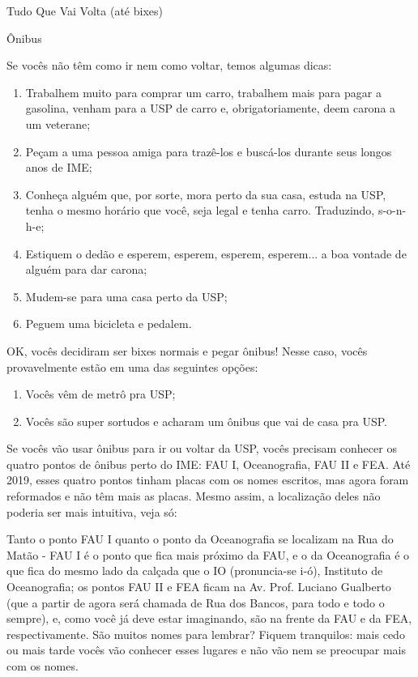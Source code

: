 \begin{secao}{Tudo Que Vai Volta (até bixes)}

\begin{subsecao}{Ônibus}

Se vocês não têm como ir nem como voltar, temos algumas dicas:

\begin{enumerate}
  \item Trabalhem muito para comprar um carro,
  trabalhem mais para pagar a gasolina,
  venham para a USP de carro e, obrigatoriamente, deem carona a um veterane;

  \item Peçam a uma pessoa amiga para trazê-los e buscá-los durante seus
  longos anos de IME;

  \item Conheça alguém que, por sorte, mora perto da sua casa, estuda na USP,
  tenha o mesmo horário que você, seja legal e tenha carro. Traduzindo, s-o-n-h-e;

  \item Estiquem o dedão e esperem, esperem, esperem, esperem... a boa vontade
  de alguém para dar carona;

  \item Mudem-se para uma casa perto da USP;

  \item Peguem uma bicicleta e pedalem.

\end{enumerate}

OK, vocês decidiram ser bixes normais e pegar ônibus! Nesse caso, vocês
provavelmente estão em uma das seguintes opções:

\begin{enumerate}
  \item Vocês vêm de metrô pra USP;
  \item Vocês são super sortudos e acharam um ônibus que vai de casa pra USP.
\end{enumerate}

Se vocês vão usar ônibus para ir ou voltar da USP, vocês precisam conhecer
os quatro pontos de ônibus perto do IME: FAU I, Oceanografia, FAU II e FEA.
Até 2019, esses quatro pontos tinham placas com os nomes escritos, mas
agora foram reformados e não têm mais as placas. Mesmo assim, a localização deles
não poderia ser mais intuitiva, veja só:

Tanto o ponto FAU I quanto o ponto da Oceanografia se localizam na Rua do
Matão - FAU I é o ponto que fica mais próximo da FAU, e o da Oceanografia é o
que fica do mesmo lado da calçada que o IO (pronuncia-se i-ó), Instituto de
Oceanografia; os pontos FAU II e FEA ficam na Av. Prof. Luciano Gualberto (que a
partir de agora será chamada de Rua dos Bancos, para todo e todo o sempre),
e, como você já deve estar imaginando, são na frente da FAU e da FEA,
respectivamente. São muitos nomes para lembrar? Fiquem tranquilos: mais
cedo ou mais tarde vocês vão conhecer esses lugares e não vão nem se preocupar
mais com os nomes.



\end{subsecao}
\end{secao}
